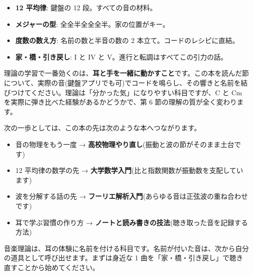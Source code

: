 \documentclass{article}
\begin{document}
\begin{itemize}
\item \textbf{12 平均律}: 鍵盤の 12 段。すべての音の材料。
\item \textbf{メジャーの型}: 全全半全全全半。家の位置がキー。
\item \textbf{度数の数え方}: 名前の数と半音の数の 2 本立て。コードのレシピに直結。
\item \textbf{家・橋・引き戻し}: I と IV と V。進行と転調はすべてこの引力の話。
\end{itemize}

理論の学習で一番効くのは、\textbf{耳と手を一緒に動かすこと}です。この本を読んだ節について、実際の音(鍵盤アプリでも可)でコードを鳴らし、その響きと名前を結びつけてください。理論は「分かった気」になりやすい科目ですが、C と Cm を実際に弾き比べた経験があるかどうかで、第 6 節の理解の質が全く変わります。

次の一歩としては、この本の先は次のような本へつながります。

\begin{itemize}
\item 音の物理をもう一度 → \textbf{高校物理やり直し}(振動と波の節がそのまま土台です)
\item 12 平均律の数学の先 → \textbf{大学数学入門}(比と指数関数が振動数を支配しています)
\item 波を分解する話の先 → \textbf{フーリエ解析入門}(あらゆる音は正弦波の重ね合わせです)
\item 耳で学ぶ習慣の作り方 → \textbf{ノートと読み書きの技法}(聴き取った音を記録する方法)
\end{itemize}

音楽理論は、耳の体験に名前を付ける科目です。名前が付いた音は、次から自分の道具として呼び出せます。まずは身近な 1 曲を「家・橋・引き戻し」で聴き直すことから始めてください。
\end{document}
